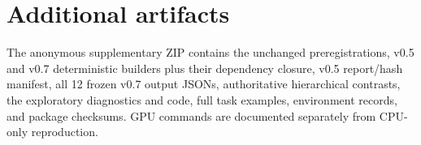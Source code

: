 \documentclass{article}
\begin{document}
\section{Additional artifacts}
The anonymous supplementary ZIP contains the unchanged preregistrations, v0.5 and v0.7 deterministic builders plus their dependency closure, v0.5 report/hash manifest, all 12 frozen v0.7 output JSONs, authoritative hierarchical contrasts, the exploratory diagnostics and code, full task examples, environment records, and package checksums. GPU commands are documented separately from CPU-only reproduction.
\end{document}
